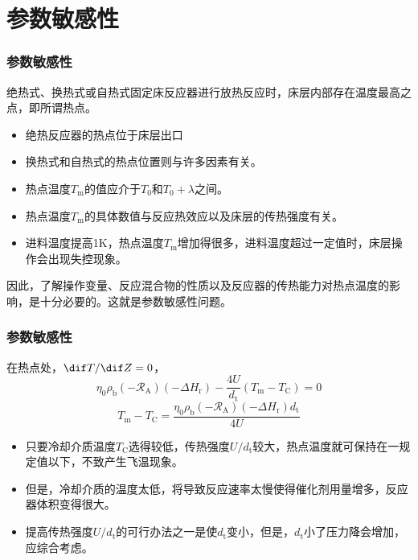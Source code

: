 \section{参数敏感性}


\begin{frame}
    \frametitle{参数敏感性}

    绝热式、换热式或自热式固定床反应器进行放热反应时，床层内部存在温度最高之点，即所谓热点。
    \begin{itemize}
        \item 绝热反应器的热点位于床层出口
        \item 换热式和自热式的热点位置则与许多因素有关。
        \item 热点温度$T_\mathrm{m}$的值应介于$T_0$和$T_0 + \lambda$之间。
        \item 热点温度$T_\mathrm{m}$的具体数值与反应热效应以及床层的传热强度有关。
        \item 进料温度提高1K，热点温度$T_\mathrm{m}$增加得很多，进料温度超过一定值时，床层操作会出现失控现象。
    \end{itemize}
    因此，了解操作变量、反应混合物的性质以及反应器的传热能力对热点温度的影响，是十分必要的。这就是参数敏感性问题。

\end{frame}


\begin{frame}
    \frametitle{参数敏感性}

    在热点处，$\dif T/ \dif Z = 0$，
    \[
        \eta_{0} \rho_{\mathrm{b}}(-\mathscr{R}_{\mathrm{A}})(-\Delta H_{\mathrm{r}})-\frac{4 U}{d_{\mathrm{t}}}(T_{\mathrm{m}}-T_{\mathrm{C}})=0
    \]
    \[
        T_{\mathrm{m}}-T_{\mathrm{C}}=\frac{\eta_{\mathrm{0}} \rho_{\mathrm{b}}(-\mathscr{R}_{\mathrm{A}})(-\Delta H_{\mathrm{r}}) d_{\mathrm{t}}}{4 U}
    \]
    \begin{itemize}
        \item 只要冷却介质温度$T_{\mathrm{C}}$选得较低，传热强度$U/d_{\mathrm{t}}$较大，热点温度就可保持在一规定值以下，不致产生飞温现象。
        \item 但是，冷却介质的温度太低，将导致反应速率太慢使得催化剂用量增多，反应器体积变得很大。
        \item 提高传热强度$U/d_{\mathrm{t}}$的可行办法之一是使$d_{\mathrm{t}}$变小，但是，$d_{\mathrm{t}}$小了压力降会增加，应综合考虑。
    \end{itemize}

\end{frame}


